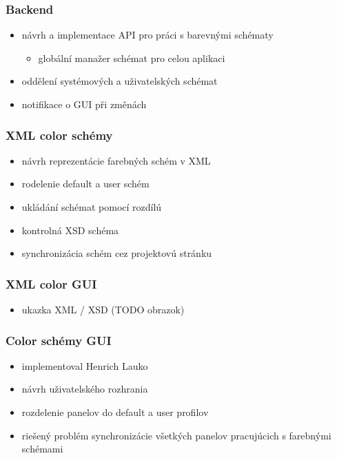 \documentclass[slovak]{beamer}
\begin{document}
\begin{frame}
\frametitle{Backend}
	\begin{itemize}
		\item návrh a implementace API pro práci s barevnými schématy
		\begin{itemize}
			\item globální manažer schémat pro celou aplikaci
		\end{itemize}
		\item oddělení systémových a uživatelských schémat
		\item notifikace o GUI při změnách
	\end{itemize}
\end{frame}

\begin{frame}
\frametitle{XML color schémy}
	\begin{itemize}
		\item návrh reprezentácie farebných schém v XML
		\item rodelenie default a user schém
		\item ukládání schémat pomocí rozdílú
		\item kontrolná XSD schéma
		\item synchronizácia schém cez projektovú stránku
	\end{itemize}
\end{frame}

\begin{frame}
\frametitle{XML color GUI}
	\begin{itemize}
		\item ukazka XML / XSD (TODO obrazok)
	\end{itemize}
\end{frame}

\begin{frame}
\frametitle{Color schémy GUI}
	\begin{itemize}
		\item implementoval Henrich Lauko
		\item návrh uživatelského rozhrania
		\item rozdelenie panelov do default a user profilov
		\item riešený problém synchronizácie všetkých panelov pracujúcich s farebnými schémami
	\end{itemize}
\end{frame}
\end{document}
